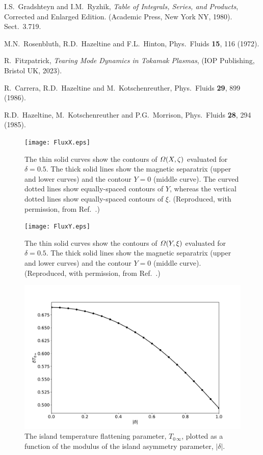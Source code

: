 \documentclass[12pt,prb,aps]{revtex4-1}
\begin{document}
\begin{thebibliography}{99}
 I.S.~Gradshteyn and I.M.~Ryzhik, {\em Table of Integrals, Series, and Products}, Corrected and Enlarged Edition. (Academic Press, New York NY, 1980). Sect.~3.719.

 M.N.~Rosenbluth, R.D.~Hazeltine and F.L.~Hinton, Phys.\ Fluids {\bf 15}, 116 (1972).

 R.~Fitzpatrick, {\em Tearing Mode Dynamics in Tokamak Plasmas}, (IOP Publishing, Bristol UK, 2023).

 R.~Carrera, R.D.~Hazeltine and M.~Kotschenreuther, Phys.\ Fluids {\bf 29}, 899 (1986). 

 R.D.~Hazeltine, M.~Kotschenreuther and P.G.~Morrison, Phys.\ Fluids {\bf 28}, 294 (1985). 

\end{thebibliography}

\newpage
\begin{figure}
\centerline{\texttt{[image: FluxX.eps]}}
\caption{The thin solid curves show the contours of ${\mit\Omega}(X,\zeta)$ evaluated for $\delta=0.5$. The thick solid
lines show the magnetic separatrix (upper and lower curves) and the contour $Y=0$ (middle curve). The curved dotted
lines show equally-spaced contours of $Y$, whereas the vertical dotted lines show equally-spaced contours of $\xi$. 
(Reproduced, with permission, from Ref.~.) \label{fig1}}
\end{figure}

\begin{figure}
\centerline{\texttt{[image: FluxY.eps]}}
\caption{The thin solid curves show the contours of ${\mit\Omega}(Y,\xi)$ evaluated for $\delta=0.5$. The thick solid
lines show the magnetic separatrix (upper and lower curves) and the contour $Y=0$ (middle curve). (Reproduced, with permission, from Ref.~.) \  \label{fig2}}
\end{figure}

\begin{figure}
\centerline{\includegraphics[width=\textwidth]{T0infty.pdf}}
\caption{The island temperature flattening parameter, $T_{0\,\infty}$, plotted as a function of the modulus of the island asymmetry parameter, $|\delta|$.  \label{fig3}}
\end{figure}
\end{document}
